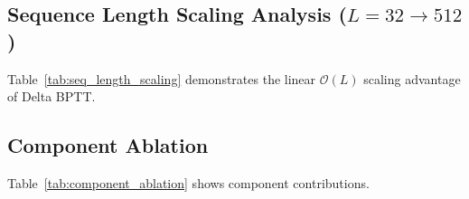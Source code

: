 \documentclass[10pt,journal,compsoc]{IEEEtran}
\begin{document}
\subsection{Sequence Length Scaling Analysis \texorpdfstring{($L=32 \to 512$)}{L=32 to 512}}
Table~\ref{tab:seq_length_scaling} demonstrates the linear $\mathcal{O}(L)$ scaling advantage of Delta BPTT.

\begin{table}[t!]
\caption{Empirical scaling behavior across sequence lengths $L \in \{32, 64, 128, 256, 512\}$.}
\label{tab:seq_length_scaling}
\begin{center}
\end{center}
\end{table}

\subsection{Component Ablation}
Table~\ref{tab:component_ablation} shows component contributions.
\end{document}
